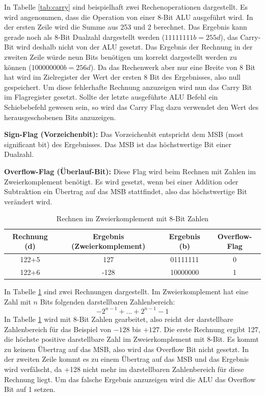 \documentclass[12pt]{article}
\begin{document}
\noindent In Tabelle \ref{tab:carry} sind beispielhaft zwei Rechenoperationen dargestellt. Es wird angenommen, dass die Operation von einer 8-Bit ALU ausgeführt wird. In der ersten Zeile wird die Summe aus 253 und 2 berechnet. Das Ergebnis kann gerade noch als 8-Bit Dualzahl dargestellt werden ($11111111b = 255d$), das Carry-Bit wird deshalb nicht von der ALU gesetzt. Das Ergebnis der Rechnung in der zweiten Zeile  würde neun Bits benötigen um korrekt dargestellt werden zu können ($100000000b = 256d$). Da das Rechenwerk aber nur eine Breite von 8 Bit hat wird im Zielregister der Wert der ersten 8 Bit des Ergebnisses, also null gespeichert. Um diese fehlerhafte Rechnung anzuzeigen wird nun das Carry Bit im Flagregister gesetzt.  
Sollte der letzte ausgeführte ALU Befehl ein Schiebebefehl gewesen sein, so wird das Carry Flag dazu verwendet den Wert des herausgeschobenen Bits anzuzeigen.

\par\bigskip\noindent \textbf{Sign-Flag (Vorzeichenbit):} Das Vorzeichenbit entspricht dem MSB (most significant bit) des Ergebnisses. Das MSB ist das höchstwertige Bit einer Dualzahl.

 \par\bigskip\noindent \textbf{Overflow-Flag (Überlauf-Bit):} Diese Flag wird beim Rechnen mit Zahlen im Zweierkomplement benötigt. Es wird gesetzt, wenn bei einer Addition oder Subtraktion ein Übertrag auf das MSB stattfindet, also das höchstwertige Bit verändert wird. 
\begin{table}[!htb]
\centering
\begin{tabular}{|c|c|c|c|}
\hline
Rechnung (d) & Ergebnis (Zweierkomplement) & Ergebnis (b) & Overflow-Flag \\ \hline 
122+5        & 127                         & 01111111     & 0            \\ \hline 
122+6        & -128                        & 10000000      & 1            \\ \hline

\end{tabular}
\caption{Rechnen im Zweierkomplement mit 8-Bit Zahlen}

\label{tab:overflow}
\end{table}

\noindent In Tabelle \ref{tab:overflow} sind zwei Rechnungen dargestellt. Im Zweierkomplement hat eine Zahl mit $n$ Bits folgenden darstellbaren Zahlenbereich: 
$${-2}^{n-1}+ ... +2^{n-1}-1$$
In Tabelle \ref{tab:overflow} wird mit 8-Bit Zahlen gearbeitet, also reicht der darstellbare Zahlenbereich für das Beispiel von $-128$ bis $+127$. Die erste Rechnung ergibt 127, die höchste positive darstellbare Zahl im Zweierkomplement mit 8-Bit. Es kommt zu keinem Übertrag auf das MSB, also wird das Overflow Bit nicht gesetzt. In der zweiten Zeile kommt es zu einem Übertrag auf das MSB und das Ergebnis wird verfälscht, da +128 nicht mehr im darstellbaren Zahlenbereich für diese Rechnung liegt. Um das falsche Ergebnis anzuzeigen wird die ALU das Overflow Bit auf 1 setzen. 
\end{document}
